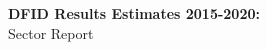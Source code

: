 


\vspace*{3cm}
{\noindent\Huge\textbf{DFID Results Estimates 2015-2020:} \\
Sector Report\par}

\vspace{14cm}


\begin{minipage}{6in}
  \centering
  \hspace*{.2in}
\end{minipage}


\thispagestyle{empty}

\newpage

